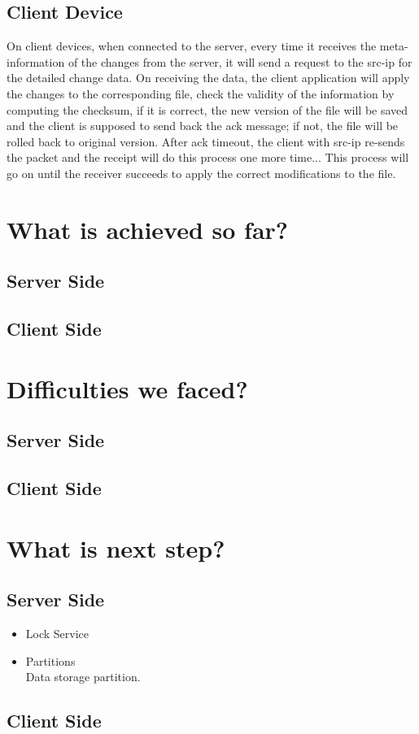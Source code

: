 \documentclass[paper=a4, fontsize=11pt]{scrartcl}
\numberwithin{equation}{section}		%
\numberwithin{figure}{section}			%
\numberwithin{table}{section}				%
\begin{document}
\subsection{Client Device}
On client devices, when connected to the server, every time it receives the meta-information of the changes from the server, it will send a request to the src-ip for the detailed change data. On receiving the data, the client application will apply the changes to the corresponding file, check the validity of the information by computing the checksum, if it is correct, the new version of the file will be saved and the client is supposed to send back the ack message; if not, the file will be rolled back to original version. After ack timeout, the client with src-ip re-sends the packet and the receipt will do this process one more time... This process will go on until the receiver succeeds to apply the correct modifications to the file. 
\section{What is achieved so far?}
\subsection{Server Side}
\subsection{Client Side}
\section{Difficulties we faced?}
\subsection{Server Side}
\subsection{Client Side}
\section{What is next step?}
\subsection{Server Side}
\begin{itemize}
\item Lock Service\\
    
\item Partitions\\
    Data storage partition.
\end{itemize}

\subsection{Client Side}
\end{document}
